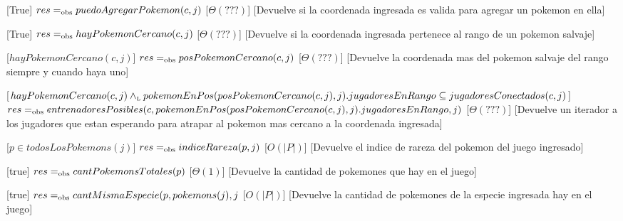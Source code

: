 \begin{Interfaz}
  [True]
  {$res =_{\mathrm{obs}} puedoAgregarPokemon(c,j)$}
  [$\Theta(???)$] 
  [Devuelve si la coordenada ingresada es valida para agregar un pokemon en ella]

  [True]
  {$res =_{\mathrm{obs}} hayPokemonCercano(c,j)$}
  [$\Theta(???)$] 
  [Devuelve si la coordenada ingresada pertenece al rango de un pokemon salvaje]   

  [$hayPokemonCercano(c,j)$]
  {$res =_{\mathrm{obs}} posPokemonCercano(c,j)$}
  [$\Theta(???)$] %
  [Devuelve la coordenada mas del pokemon salvaje del rango siempre y cuando haya uno]   

  [$hayPokemonCercano(c,j) \land_{\mathrm{\scriptscriptstyle{L}}} pokemonEnPos(posPokemonCercano(c,j),j).jugadoresEnRango \subseteq jugadoresConectados(c,j)$]
  {$res =_{\mathrm{obs}} entrenadoresPosibles(c,pokemonEnPos(posPokemonCercano(c,j),j).jugadoresEnRango,j)$}
  [$\Theta(???)$] 
  [Devuelve un iterador a los jugadores que estan esperando para atrapar al pokemon mas cercano a la coordenada ingresada]   

  [$p \in todosLosPokemons(j)$]
  {$res =_{\mathrm{obs}} indiceRareza(p,j)$}
  [$O(|P|)$] 
  [Devuelve el indice de rareza del pokemon del juego ingresado]

  [true]
  {$res =_{\mathrm{obs}} cantPokemonsTotales(p)$}
  [$\Theta(1)$] 
  [Devuelve la cantidad de pokemones que hay en el juego]

  [true]
  {$res =_{\mathrm{obs}} cantMismaEspecie(p, pokemons(j), j$}
  [$O(|P|)$] 
  [Devuelve la cantidad de pokemones de la especie ingresada hay en el juego]

  
\end{Interfaz}

